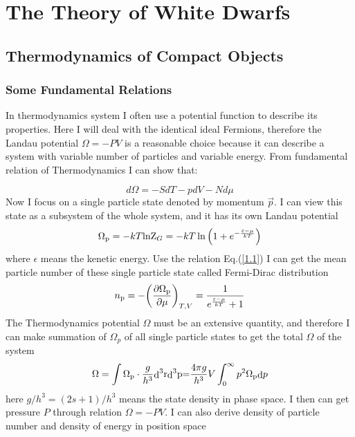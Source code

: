 \documentclass[preprint]{revtex4-1}
\begin{document}
\section{The Theory of White Dwarfs}
\subsection{Thermodynamics of Compact Objects}
\subsubsection{Some Fundamental Relations}
In thermodynamics system I often use a potential function to describe its properties. Here I will deal with the identical ideal Fermions, therefore the Landau potential $\Omega  =  - PV$ is a reasonable choice because it can describe a system with variable number of particles and variable energy. From fundamental relation of Thermodynamics I can show that:\par
\begin{equation}
d \Omega  =  - Sd T - pd V - Nd \mu  \label{1.1}
\end{equation}
Now I focus on a single particle state denoted by momentum $\vec{p}$. I can view this state as a subsystem of the whole system, and it has its own Landau potential
\begin{equation}
{\Omega _{\rm{p}}} =  - kT{{\mathop{\rm lnZ}\nolimits} _G} =  - kT\ln \left( {1 + {e^{ - \frac{{\varepsilon  - \mu }}{{kT}}}}} \right) \label{1.2}
\end{equation}
where $\epsilon$ means the kenetic energy. Use the relation Eq.(\ref{1.1}) I can get the mean particle number of these single particle state called Fermi-Dirac distribution
\begin{equation}
{n_{\rm{p}}} =  - {\left( {\frac{{\partial {\Omega _{\rm{p}}}}}{{\partial \mu }}} \right)_{T,V}} = \frac{1}{{{e^{\frac{{\varepsilon  - \mu }}{{kT}}}} + 1}} \label{1.3}
\end{equation}
The Thermodynamics potential $\Omega$  must be an extensive quantity, and therefore I can make summation of $\Omega_p$  of all single particle states to get the total $\Omega$  of the system
\begin{equation}
\Omega  = \int {{\Omega _{\rm{p}}} \cdot \frac{g}{{{h^3}}}{\mathop{\rm d}\nolimits}^3 {\rm{r}}{\mathop{\rm d}\nolimits}^3 {\rm{p}}} {\rm{ = }}\frac{{4\pi g}}{{{h^3}}}V\int_0^\infty  {{p^2}{\Omega _{\rm{p}}}{\mathop{\rm d}\nolimits} p}  \label{1.4}
\end{equation}
here $g/{h^3} = \left( {2s + 1} \right)/{h^3}$ means the state density in phase space. I then can get pressure $P$  through relation $\Omega  =  - PV$. I can also derive density of particle number and density of energy in position space
\end{document}

